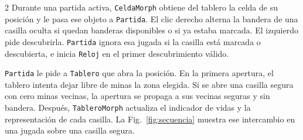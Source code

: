 \documentclass[a4paper,10pt]{article}
\begin{document}
\begin{multicols}{2}
Durante una partida activa, \texttt{CeldaMorph} obtiene del tablero la celda de su posición y le pasa ese objeto a \texttt{Partida}. El clic derecho alterna la bandera de una casilla oculta si quedan banderas disponibles o si ya estaba marcada. El izquierdo pide descubrirla. \texttt{Partida} ignora esa jugada si la casilla está marcada o descubierta, e inicia \texttt{Reloj} en el primer descubrimiento válido.

\texttt{Partida} le pide a \texttt{Tablero} que abra la posición. En la primera apertura, el tablero intenta dejar libre de minas la zona elegida. Si se abre una casilla segura con cero minas vecinas, la apertura se propaga a sus vecinas seguras y sin bandera. Después, \texttt{TableroMorph} actualiza el indicador de vidas y la representación de cada casilla. La Fig.~\ref{fig:secuencia} muestra ese intercambio en una jugada sobre una casilla segura.

\end{multicols}
\newpage

\begin{center}
\begin{minipage}{\textwidth}
  \centering
  
  \label{fig:secuencia}
\end{minipage}
\end{center}
\end{document}

